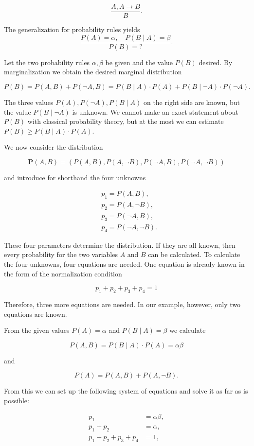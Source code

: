 \documentclass[10pt]{book}
\begin{document}
$$
\frac{A, A \rightarrow B}{B} .
$$

The generalization for probability rules yields
$$
\frac{P(A)=\alpha, \quad P(B \mid A)=\beta}{P(B)=?} .
$$

Let the two probability rules $\alpha, \beta$ be given and the value $P(B)$ desired. By marginalization we obtain the desired marginal distribution

$$
P(B)=P(A, B)+P(\neg A, B)=P(B \mid A) \cdot P(A)+P(B \mid \neg A) \cdot P(\neg A) .
$$

The three values $P(A), P(\neg A), P(B \mid A)$ on the right side are known, but the value $P(B \mid \neg A)$ is unknown. We cannot make an exact statement about $P(B)$ with classical probability theory, but at the most we can estimate $P(B) \geq P(B \mid A) \cdot P(A)$.

We now consider the distribution

$$
\boldsymbol{P}(A, B)=(P(A, B), P(A, \neg B), P(\neg A, B), P(\neg A, \neg B))
$$

and introduce for shorthand the four unknowns

$$
\begin{aligned}
& p_{1}=P(A, B), \\
& p_{2}=P(A, \neg B), \\
& p_{3}=P(\neg A, B), \\
& p_{4}=P(\neg A, \neg B) .
\end{aligned}
$$

These four parameters determine the distribution. If they are all known, then every probability for the two variables $A$ and $B$ can be calculated. To calculate the four unknowns, four equations are needed. One equation is already known in the form of the normalization condition

$$
p_{1}+p_{2}+p_{3}+p_{4}=1
$$

Therefore, three more equations are needed. In our example, however, only two equations are known.

From the given values $P(A)=\alpha$ and $P(B \mid A)=\beta$ we calculate

$$
P(A, B)=P(B \mid A) \cdot P(A)=\alpha \beta
$$

and

$$
P(A)=P(A, B)+P(A, \neg B) .
$$

From this we can set up the following system of equations and solve it as far as is possible:

\begin{align*}
p_{1} & =\alpha \beta,  \tag{7.4}\\
p_{1}+p_{2} & =\alpha,  \tag{7.5}\\
p_{1}+p_{2}+p_{3}+p_{4} & =1, \tag{7.6}
\end{align*}
\end{document}
